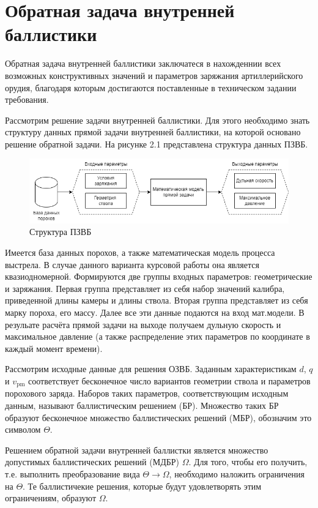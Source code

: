 \documentclass[14pt, a4paper]{extreport} %
\begin{document}
\section{Обратная задача внутренней баллистики}

Обратная задача внутренней баллистики заключатеся в нахожденнии всех возможных конструктивных значений и параметров заряжания артиллерийского орудия, благодаря которым достигаются 
поставленные в техническом задании требования. 

Рассмотрим решение задачи внутренней баллистики. Для этого необходимо знать структуру данных прямой задачи внутренней баллистики, на которой основано решение обратной задачи.
На рисунке 2.1 представлена структура данных ПЗВБ.

\begin{figure}[h]
\centering
\includegraphics[width=0.7\textheight]{imgs/PZVB_sctruct.png}
\caption{Структура ПЗВБ}
\end{figure}

Имеется база данных порохов, а также математическая модель процесса выстрела. В случае данного варианта курсовой работы она является квазиодномерной. Формируются две группы входных параметров: геометрические и заряжания.
Первая группа представляет из себя набор значений калибра, приведенной длины камеры и длины ствола. Вторая группа представляет из себя марку пороха, его массу. Далее все эти данные подаются на вход мат.модели. В резульате расчёта прямой задачи 
на выходе получаем дульную скорость и максимальное давление (а также распределение этих параметров по координате в каждый момент времени).

Рассмотрим исходные данные для решения ОЗВБ. Заданным характеристикам $d$, $q$ и $v_{\text{pm}}$ соответствует бесконечное число вариантов геометрии ствола и параметров порохового заряда. Наборов таких параметров, соответствующим исходным данным, называют баллистическим решением (БР). Множество таких БР образуют бесконечное множество баллистических решений (МБР), обозначим это символом $\Theta$.

Решением обратной задачи внутренней баллистки является множество допустимых баллистических решений (МДБР) $\Omega$. Для того, чтобы его получить, т.е. выполнить преобразование вида $\Theta \longrightarrow \Omega $, необходимо наложить ограничения на $\Theta $. Те баллистичекие решения, которые будут удовлетворять этим ограничениям, образуют $\Omega $.
\end{document}
